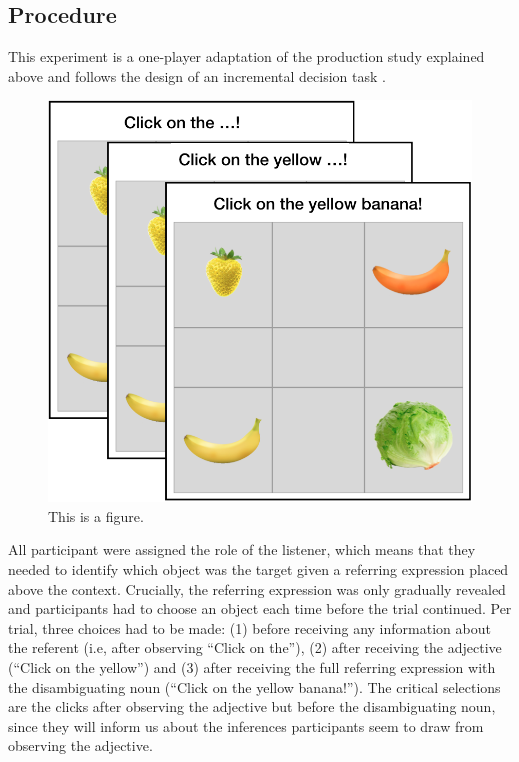 \documentclass[10pt,letterpaper]{article}
\begin{document}


\subsection{Procedure}
This experiment is a one-player adaptation of the production study explained above and follows the design of an incremental decision task \cite{Qing:2018}. 

\begin{figure}
	\begin{center}
		\includegraphics[width=.4\textwidth]{graphs/IDT-design.pdf}
	\end{center}
\caption{This is a figure.} 
\label{prod-results}
\end{figure}

All participant were assigned the role of the listener, which means that they needed to identify which object was the target given a referring expression placed above the context. Crucially, the referring expression was only gradually revealed and participants had to choose an object each time before the trial continued. Per trial, three choices had to be made: (1) before receiving any information about the referent (i.e, after observing ``Click on the''), (2) after receiving the adjective (``Click on the yellow'') and (3) after receiving the full referring expression with the disambiguating noun (``Click on the yellow banana!''). 
The critical selections are the clicks after observing the adjective but before the disambiguating noun, since they will inform us about the inferences participants seem to draw from observing the adjective. 
\end{document}
